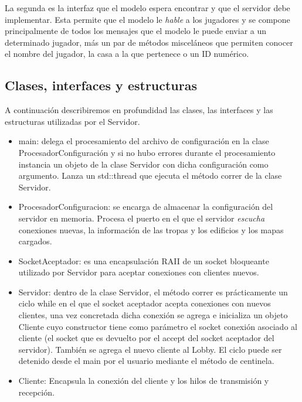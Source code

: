 \documentclass[titlepage,a4paper,12pt]{article}
\begin{document}
La segunda es la interfaz que el modelo espera encontrar y que el servidor debe implementar. Esta permite que el modelo le \textit{hable} a los jugadores y se compone principalmente de todos los mensajes que el modelo le puede enviar a un determinado jugador, más un par de métodos misceláneos que permiten conocer el nombre del jugador, la casa a la que pertenece o un ID numérico.

\subsection{Clases, interfaces y estructuras}

A continuación describiremos en profundidad las clases, las interfaces y las estructuras utilizadas por el Servidor.

\begin{itemize}

\item main: delega el procesamiento del archivo de configuración en la clase ProcesadorConfiguración y si no hubo errores durante el procesamiento instancia un objeto de la clase Servidor con dicha configuración como argumento. Lanza un std::thread que ejecuta el método correr de la clase Servidor.

\item ProcesadorConfiguracion: se encarga de almacenar la configuración del servidor en memoria. Procesa el puerto en el que el servidor \textit{escucha}  conexiones nuevas, la información de las tropas y los edificios y los mapas cargados.

\item SocketAceptador: es una encapsulación RAII de un socket bloqueante utilizado por Servidor para aceptar conexiones con clientes nuevos.

\item Servidor: dentro de la clase Servidor, el método correr es prácticamente un ciclo while en el que el socket aceptador acepta conexiones con nuevos clientes, una vez concretada dicha conexión se agrega e inicializa un objeto Cliente cuyo constructor tiene como parámetro el socket conexión asociado al cliente (el socket que es devuelto por el accept del socket aceptador del servidor). También se agrega el nuevo cliente al Lobby. El ciclo puede ser detenido desde el main por el usuario mediante el método de centinela.

\item Cliente: Encapsula la conexión del cliente y los hilos de transmisión y recepción.


\end{itemize}
\end{document}
